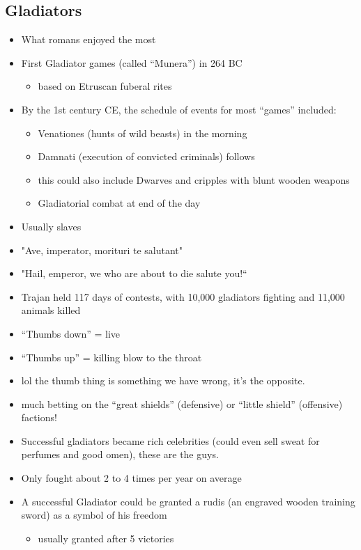 \documentclass[12pt, twoside]{article}
\begin{document}
\subsection{Gladiators}
\begin{itemize}
\item What romans enjoyed the most
\item First Gladiator games (called “Munera”) in 264 BC
	\begin{itemize}
	\item based on Etruscan fuberal rites
	\end{itemize}
\item By the 1st century CE, the schedule of events for most “games” included:
	\begin{itemize}
	\item Venationes (hunts of wild beasts) in the morning
	\item Damnati (execution of convicted criminals) follows
	\item this could also include Dwarves and cripples with blunt wooden weapons
	\item Gladiatorial combat at end of the day
	\end{itemize}
\item Usually slaves
\item "Ave, imperator, morituri te salutant"
\item "Hail, emperor, we who are about to die salute you!“
\item Trajan held 117 days of contests, with 10,000 gladiators fighting and 11,000 animals killed
\item “Thumbs down” = live
\item “Thumbs up” = killing blow to the throat
\item lol the thumb thing is something we have wrong, it's the opposite.
\item much betting on the “great shields” (defensive) or “little shield” (offensive) factions!
\item Successful gladiators became rich celebrities (could even sell sweat for perfumes and good omen), these are the guys.
\item Only fought about 2 to 4 times per year on average
\item A successful Gladiator could be granted a rudis (an engraved wooden training sword) as a symbol of his freedom
	\begin{itemize}
	\item usually granted after 5 victories
	\end{itemize}
\end{itemize}
\end{document}
